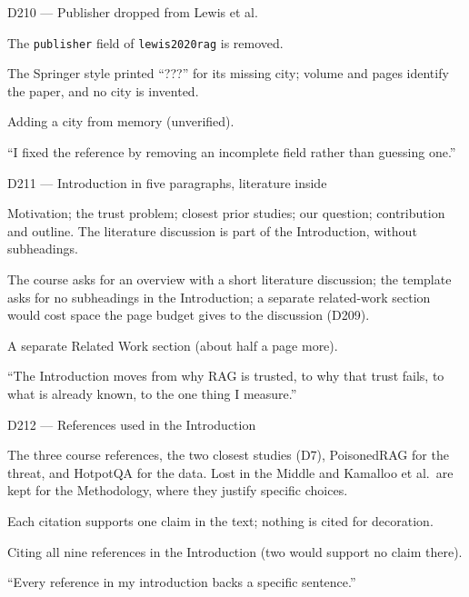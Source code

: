 \documentclass[11pt,a4paper]{report}
\begin{document}
\begin{decisionbox}{D210 --- Publisher dropped from Lewis et al.}
\begin{description}[nosep, leftmargin=0pt]
  \item[Decision.] The \texttt{publisher} field of \texttt{lewis2020rag} is removed.
  \item[Why.] The Springer style printed ``???'' for its missing city; volume and pages identify the paper, and no city is invented.
  \item[Alternatives.] Adding a city from memory (unverified).
  \item[Interview line.] ``I fixed the reference by removing an incomplete field rather than guessing one.''
\end{description}
\end{decisionbox}

\begin{decisionbox}{D211 --- Introduction in five paragraphs, literature inside}
\begin{description}[nosep, leftmargin=0pt]
  \item[Decision.] Motivation; the trust problem; closest prior studies; our question; contribution and outline. The literature discussion is part of the Introduction, without subheadings.
  \item[Why.] The course asks for an overview with a short literature discussion; the template asks for no subheadings in the Introduction; a separate related-work section would cost space the page budget gives to the discussion (D209).
  \item[Alternatives.] A separate Related Work section (about half a page more).
  \item[Interview line.] ``The Introduction moves from why RAG is trusted, to why that trust fails, to what is already known, to the one thing I measure.''
\end{description}
\end{decisionbox}

\begin{decisionbox}{D212 --- References used in the Introduction}
\begin{description}[nosep, leftmargin=0pt]
  \item[Decision.] The three course references, the two closest studies (D7), PoisonedRAG for the threat, and HotpotQA for the data. Lost in the Middle and Kamalloo et al.\ are kept for the Methodology, where they justify specific choices.
  \item[Why.] Each citation supports one claim in the text; nothing is cited for decoration.
  \item[Alternatives.] Citing all nine references in the Introduction (two would support no claim there).
  \item[Interview line.] ``Every reference in my introduction backs a specific sentence.''
\end{description}
\end{decisionbox}
\end{document}
